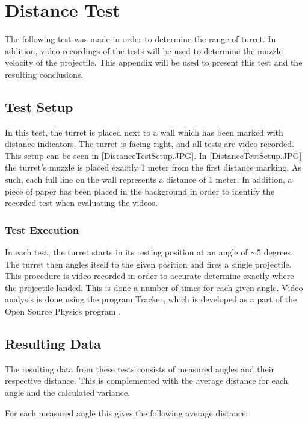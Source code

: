 \chapter{Distance Test}\label{AppendixDistTest}
The following test was made in order to determine the range of turret. In
addition, video recordings of the tests will be used to determine the muzzle
velocity of the projectile. This appendix will be used to present this test and
the resulting conclusions.

\section{Test Setup}
In this test, the turret is placed next to a wall which has been marked with
distance indicators. The turret is facing right, and all tests are video
recorded. This setup can be seen in \autoref{DistanceTestSetup.JPG}.
 In \autoref{DistanceTestSetup.JPG} the turret's muzzle is placed exactly 1 meter
from the first distance marking. As such, each full line on the wall represents
a distance of 1 meter. In addition, a piece of paper has been placed in the
background in order to identify the recorded test when evaluating the videos. 

\subsection{Test Execution}
In each test, the turret starts in its resting position at an angle of $\sim$5
degrees. The turret then angles itself to the given position and fires a single
projectile. This procedure is video recorded in order to accurate determine
exactly where the projectile landed. This is done a number of times for each
given angle. Video analysis is done using the program Tracker, which is
developed as a part of the Open Source Physics program \cite{Tracker}.

\section{Resulting Data}
The resulting data from these tests consists of measured angles and their
respective distance. This is complemented with the average distance for each
angle and the calculated variance.

For each measured angle this gives the following average distance:

